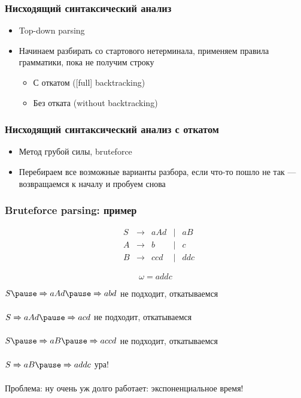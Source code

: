 \documentclass{beamer}
\newcommand{\derives}[0]{\xRightarrow[]{}}
\begin{document}
\begin{frame}[fragile]
  \transwipe[direction=90]
  \frametitle{Нисходящий синтаксический анализ}
  \begin{itemize}
    \item Top-down parsing
    \item Начинаем разбирать со стартового нетерминала, применяем правила грамматики, пока не получим строку
    \begin{itemize}
      \item С откатом ([full] backtracking)
      \item Без отката (without backtracking)
    \end{itemize}
  \end{itemize}
\end{frame}

\begin{frame}[fragile]
  \transwipe[direction=90]
  \frametitle{Нисходящий синтаксический анализ с откатом}
  \begin{itemize}
    \item Метод грубой силы, bruteforce
    \item Перебираем все возможные варианты разбора, если что-то пошло не так --- возвращаемся к началу и пробуем снова
  \end{itemize}
\end{frame}

\begin{frame}[fragile]
  \transwipe[direction=90]
  \frametitle{Bruteforce parsing: пример}
  \[
  \begin{array}{crcccl}
  &S& \to & a A d & | & a B \\
  &A& \to & b     & | & c \\
  &B& \to & c c d & | & d d c
  \end{array}
  \]

  \[\omega = a d d c\] \pause

  $S \pause \derives a A d \pause \derives a b d$ \pause \hfill не подходит, откатываемся \pause

  $S \derives a A d \pause \derives a c d$ \pause \hfill не подходит, откатываемся \pause

  $S \pause \derives a B \pause \derives a c c d$ \pause \hfill не подходит, откатываемся \pause

  $S \derives a B \pause \derives a d d c$ \pause \hfill ура!

  \vfill


  \begin{center}
    Проблема: ну очень уж долго работает: экспоненциальное время!
  \end{center}
\end{frame}
\end{document}
